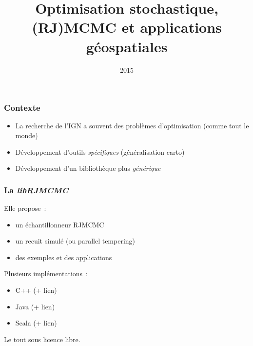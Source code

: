 \documentclass{beamer}
\title{Optimisation stochastique, (RJ)MCMC et applications g\'eospatiales}
\author{}
\institute{IGN}
\date{2015}
\begin{document}
\frame{\titlepage}
 
\begin{frame}
\frametitle{Contexte}
\begin{itemize}
\item La recherche de l'IGN a souvent des probl\`emes d'optimisation (comme tout le monde)
\item D\'eveloppement d'outils \emph{sp\'ecifiques} (g\'en\'eralisation carto)
\item D\'eveloppement d'un biblioth\`eque plus \emph{g\'en\'erique}
\end{itemize}
\end{frame}

\begin{frame}
\frametitle{La \emph{libRJMCMC}}
Elle propose~:
\begin{itemize}
\item un \'echantillonneur RJMCMC
\item un recuit simul\'e (ou parallel tempering)
\item des exemples et des applications
\end{itemize}
Plusieurs impl\'ementations~:
\begin{itemize}
\item C++ (+ lien)
\item Java (+ lien)
\item Scala (+ lien)
\end{itemize}
Le tout sous licence libre.
\end{frame}
\end{document}
